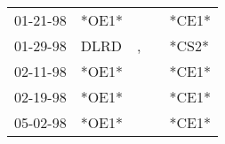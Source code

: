 \begin{supertabular}{lllll}
 01-21-98 &  *OE1* &    &   &  *CE1* \\
 01-29-98 &   DLRD &  , &   &  *CS2* \\
 02-11-98 &  *OE1* &    &   &  *CE1* \\
 02-19-98 &  *OE1* &    &   &  *CE1* \\
 05-02-98 &  *OE1* &    &   &  *CE1* \\
\end{supertabular}
